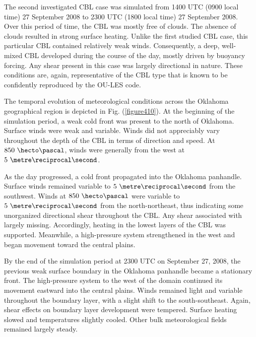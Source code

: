 The second investigated CBL case was simulated from 1400 UTC (0900 local time) 27 September 2008 to 2300 UTC (1800 local time) 27 September 2008. Over this period of time, the CBL was mostly free of clouds. The absence of clouds resulted in strong surface heating. Unlike the first studied CBL case, this particular CBL contained relatively weak winds. Consequently, a deep, well-mixed CBL developed during the course of the day, mostly driven by buoyancy forcing. Any shear present in this case was largely directional in nature. These conditions are, again, representative of the CBL type that is known to be confidently reproduced by the OU-LES code. 

The temporal evolution of meteorological conditions across the Oklahoma geographical region is depicted in Fig. (\autoref{figure410}). At the beginning of the simulation period, a weak cold front was present to the north of Oklahoma. Surface winds were weak and variable. Winds did not appreciably vary throughout the depth of the CBL in terms of direction and speed. At $850\mbox{ }\hecto\pascal$, winds were generally from the west at $5\mbox{ }\metre\reciprocal\second$. 

As the day progressed, a cold front propagated into the Oklahoma panhandle. Surface winds remained variable to $5\mbox{ }\metre\reciprocal\second$ from the southwest. Winds at $850\mbox{ }\hecto\pascal$ were variable to $5\mbox{ }\metre\reciprocal\second$ from the north-northeast, thus indicating some unorganized directional shear throughout the CBL. Any shear associated with largely missing. Accordingly, heating in the lowest layers of the CBL was supported. Meanwhile, a high-pressure system strengthened in the west and began movement toward the central plains.

By the end of the simulation period at 2300 UTC on September 27, 2008, the previous weak surface boundary in the Oklahoma panhandle became a stationary front. The high-pressure system to the west of the domain continued its movement eastward into the central plains. Winds remained light and variable throughout the boundary layer, with a slight shift to the south-southeast. Again, shear effects on boundary layer development were tempered. Surface heating slowed and temperatures slightly cooled. Other bulk meteorological fields remained largely steady.

